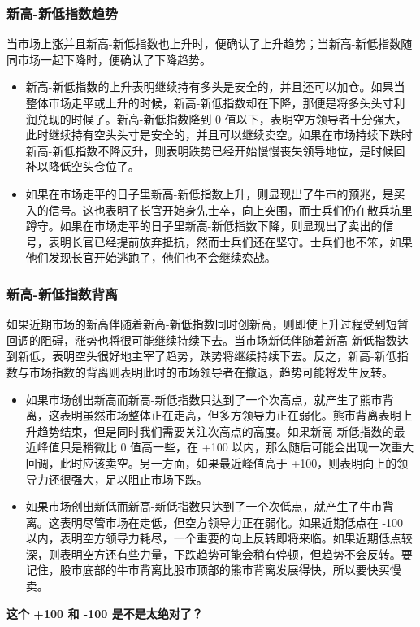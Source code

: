 \subsubsection*{新高-新低指数趋势}
当市场上涨并且新高-新低指数也上升时，便确认了上升趋势；当新高-新低指数随同市场一起下降时，便确认了下降趋势。
\begin{itemize}
    \item 新高-新低指数的上升表明继续持有多头是安全的，并且还可以加仓。如果当整体市场走平或上升的时候，新高-新低指数却在下降，那便是将多头头寸利润兑现的时候了。新高-新低指数降到 0 值以下，表明空方领导者十分强大，此时继续持有空头头寸是安全的，并且可以继续卖空。如果在市场持续下跌时新高-新低指数不降反升，则表明跌势已经开始慢慢丧失领导地位，是时候回补以降低空头仓位了。
    \item 如果在市场走平的日子里新高-新低指数上升，则显现出了牛市的预兆，是买入的信号。这也表明了长官开始身先士卒，向上突围，而士兵们仍在散兵坑里蹲守。如果在市场走平的日子里新高-新低指数下降，则显现出了卖出的信号，表明长官已经提前放弃抵抗，然而士兵们还在坚守。士兵们也不笨，如果他们发现长官开始逃跑了，他们也不会继续恋战。
\end{itemize}
\subsubsection*{新高-新低指数背离}
如果近期市场的新高伴随着新高-新低指数同时创新高，则即使上升过程受到短暂回调的阻碍，涨势也将很可能继续持续下去。当市场新低伴随着新高-新低指数达到新低，表明空头很好地主宰了趋势，跌势将继续持续下去。反之，新高-新低指数与市场指数的背离则表明此时的市场领导者在撤退，趋势可能将发生反转。
\begin{itemize}
    \item 如果市场创出新高而新高-新低指数只达到了一个次高点，就产生了熊市背离，这表明虽然市场整体正在走高，但多方领导力正在弱化。熊市背离表明上升趋势结束，但是同时我们需要关注次高点的高度。如果新高-新低指数的最近峰值只是稍微比 0 值高一些，在 +100 以内，那么随后可能会出现一次重大回调，此时应该卖空。另一方面，如果最近峰值高于 +100，则表明向上的领导力还很强大，足以阻止市场下跌。
    \item 如果市场创出新低而新高-新低指数只达到了一个次低点，就产生了牛市背离。这表明尽管市场在走低，但空方领导力正在弱化。如果近期低点在 -100 以内，表明空方领导力耗尽，一个重要的向上反转即将来临。如果近期低点较深，则表明空方还有些力量，下跌趋势可能会稍有停顿，但趋势不会反转。要记住，股市底部的牛市背离比股市顶部的熊市背离发展得快，所以要快买慢卖。
\end{itemize}
\textbf{这个 +100 和 -100 是不是太绝对了？}
